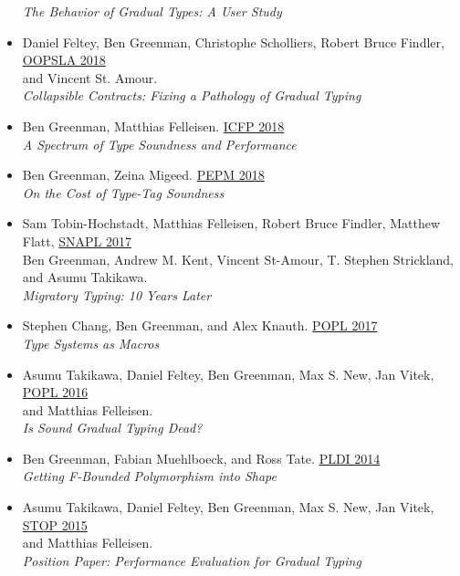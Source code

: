 \documentclass[11pt]{article}
\begin{document}
\begin{itemize}
  \emph{The Behavior of Gradual Types: A User Study}
\item
  Daniel Feltey, Ben Greenman, Christophe Scholliers, Robert Bruce Findler, \hfill \href{https://2018.splashcon.org/track/splash-2018-OOPSLA}{OOPSLA 2018} \\
  and Vincent St. Amour. \\
  \emph{Collapsible Contracts: Fixing a Pathology of Gradual Typing}
\item
  Ben Greenman, Matthias Felleisen. \hfill \href{https://icfp18.sigplan.org/}{ICFP 2018} \\
  \emph{A Spectrum of Type Soundness and Performance}
\item
  Ben Greenman, Zeina Migeed. \hfill \href{https://popl18.sigplan.org/track/PEPM-2018}{PEPM 2018} \\
  \emph{On the Cost of Type-Tag Soundness}
\item
  Sam Tobin-Hochstadt, Matthias Felleisen, Robert Bruce Findler, Matthew Flatt, \hfill \href{https://snapl.org/2017/}{SNAPL 2017} \\
  Ben Greenman, Andrew M. Kent, Vincent St-Amour, T. Stephen Strickland, \\
  and Asumu Takikawa. \\
  \emph{Migratory Typing: 10 Years Later}
\item
  Stephen Chang, Ben Greenman, and Alex Knauth. \hfill \href{https://popl17.sigplan.org/}{POPL 2017} \\
   \emph{Type Systems as Macros}
\item
  Asumu Takikawa, Daniel Feltey, Ben Greenman, Max S. New, Jan Vitek, \hfill \href{https://popl16.sigplan.org/}{POPL 2016} \\
   and Matthias Felleisen. \\
   \emph{Is Sound Gradual Typing Dead?}
\item
  Ben Greenman, Fabian Muehlboeck, and Ross Tate. \hfill \href{https://conferences.inf.ed.ac.uk/pldi2014/}{PLDI 2014} \\
  \emph{Getting F-Bounded Polymorphism into Shape}
\end{itemize}

\begin{itemize}
\item
  Asumu Takikawa, Daniel Feltey, Ben Greenman, Max S. New, Jan Vitek, \hfill \href{https://2015.ecoop.org/track/STOP2015}{STOP 2015} \\
   and Matthias Felleisen. \\
   \emph{Position Paper: Performance Evaluation for Gradual Typing}
\end{itemize}
\end{document}
